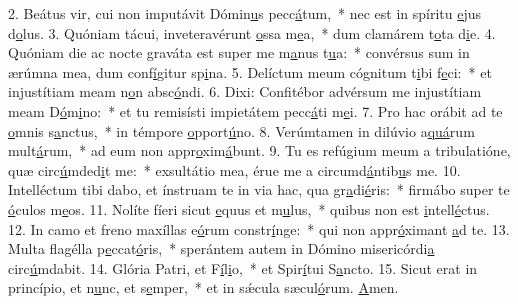 2. Beátus vir, cui non imputávit Dómin\uline{u}s pecc\uline{á}tum,~* nec est in spíritu \uline{e}jus d\uline{o}lus.
3. Quóniam tácui, inveteravérunt \uline{o}ssa m\uline{e}a,~* dum clamárem t\uline{o}ta d\uline{i}e.
4. Quóniam die ac nocte graváta est super me m\uline{a}nus t\uline{u}a:~* convérsus sum in ærúmna mea, dum conf\uline{í}gitur sp\uline{i}na.
5. Delíctum meum cógnitum t\uline{i}bi f\uline{e}ci:~* et injustítiam meam n\uline{o}n absc\uline{ó}ndi.
6. Dixi: Confitébor advérsum me injustítiam meam D\uline{ó}m\uline{i}no:~* et tu remisísti impietátem pecc\uline{á}ti m\uline{e}i.
7. Pro hac orábit ad te \uline{o}mnis s\uline{a}nctus,~* in témpore \uline{o}pport\uline{ú}no.
8. Verúmtamen in dilúvio a\uline{quá}rum mult\uline{á}rum,~* ad eum non appr\uline{o}xim\uline{á}bunt.
9. Tu es refúgium meum a tribulatióne, quæ circ\uline{ú}mded\uline{i}t me:~* exsultátio mea, érue me a circumd\uline{á}ntib\uline{u}s me.
10. Intelléctum tibi dabo, et ínstruam te in via hac, qua gr\uline{a}di\uline{é}ris:~* firmábo super te \uline{ó}culos m\uline{e}os.
11. Nolíte fíeri sicut \uline{e}quus et m\uline{u}lus,~* quibus non est \uline{i}ntell\uline{é}ctus.
12. In camo et freno maxíllas e\uline{ó}rum constr\uline{í}nge:~* qui non appr\uline{ó}ximant \uline{a}d te.
13. Multa flagélla p\uline{e}ccat\uline{ó}ris,~* sperántem autem in Dómino misericórdi\uline{a} circ\uline{ú}mdabit.
14. Glória Patri, et F\uline{í}l\uline{i}o,~* et Spir\uline{í}tui S\uline{a}ncto.
15. Sicut erat in princípio, et n\uline{u}nc, et s\uline{e}mper,~* et in sǽcula sæcul\uline{ó}rum. \uline{A}men.

